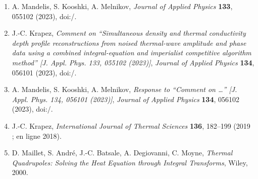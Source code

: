 \documentclass[11pt,a4paper]{article}
\begin{document}
\begin{enumerate}[leftmargin=2.2em]
\item A. Mandelis, S. Kooshki, A. Melnikov, \emph{Journal of Applied Physics} \textbf{133}, 055102
(2023), doi:/.
\item J.-C. Krapez, \emph{Comment on ``Simultaneous density and thermal conductivity depth profile
reconstructions from noised thermal-wave amplitude and phase data using a combined integral-equation and
imperialist competitive algorithm method'' [J. Appl. Phys. 133, 055102 (2023)]}, \emph{Journal of Applied
Physics} \textbf{134}, 056101 (2023), doi:/.
\item A. Mandelis, S. Kooshki, A. Melnikov, \emph{Response to ``Comment on \ldots'' [J. Appl. Phys. 134,
056101 (2023)]}, \emph{Journal of Applied Physics} \textbf{134}, 056102 (2023), doi:/.
\item J.-C. Krapez, \emph{International Journal of Thermal Sciences} \textbf{136}, 182--199 (2019 ; en ligne 2018).
\item D. Maillet, S. André, J.-C. Batsale, A. Degiovanni, C. Moyne, \emph{Thermal Quadrupoles: Solving
the Heat Equation through Integral Transforms}, Wiley, 2000.
\end{enumerate}
\end{document}
